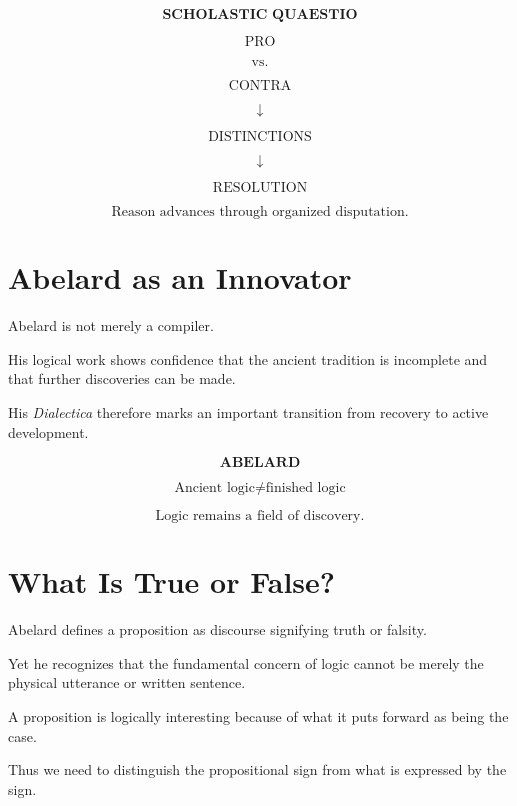 \documentclass[11pt]{article}
\begin{document}
\begin{whiteboard}
\[
\textbf{SCHOLASTIC QUAESTIO}
\]

\[
\text{PRO}
\]

\[
\text{vs.}
\]

\[
\text{CONTRA}
\]

\[
\downarrow
\]

\[
\text{DISTINCTIONS}
\]

\[
\downarrow
\]

\[
\boxed{\text{RESOLUTION}}
\]

\[
\text{Reason advances through organized disputation.}
\]
\end{whiteboard}

\section{Abelard as an Innovator}

Abelard is not merely a compiler.

His logical work shows confidence that the ancient tradition is
incomplete and that further discoveries can be made.

His \textit{Dialectica} therefore marks an important transition
from recovery to active development.

\begin{whiteboard}
\[
\textbf{ABELARD}
\]

\[
\boxed{\text{Ancient logic} \neq \text{finished logic}}
\]

\[
\text{Logic remains a field of discovery.}
\]
\end{whiteboard}

\section{What Is True or False?}

Abelard defines a proposition as discourse signifying truth or
falsity.

Yet he recognizes that the fundamental concern of logic cannot be
merely the physical utterance or written sentence.

A proposition is logically interesting because of what it puts
forward as being the case.

Thus we need to distinguish the propositional sign from what is
expressed by the sign.
\end{document}
